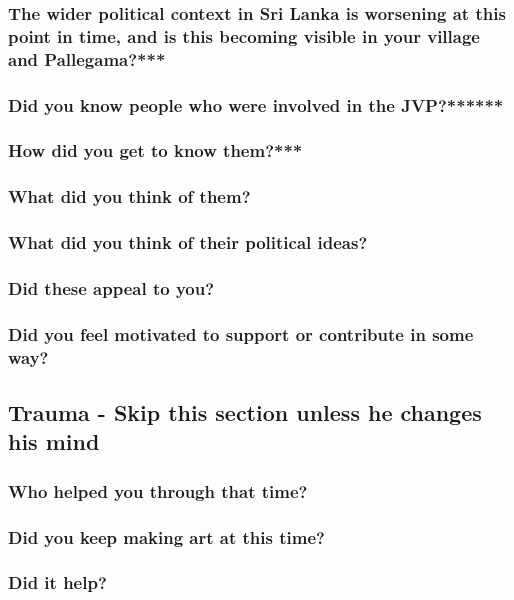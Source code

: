 \documentclass[11pt]{article}
\begin{document}
\subsubsection{The wider political context in Sri Lanka is worsening at this point in time, and is this becoming visible in your village and Pallegama?***}
\label{sec:org6ca7e3e}
\subsubsection{Did you know people who were involved in the JVP?******}
\label{sec:org410fded}
\subsubsection{How did you get to know them?***}
\label{sec:org663a0cc}
\subsubsection{What did you think of them?}
\label{sec:orga955866}
\subsubsection{What did you think of their political ideas?}
\label{sec:orgf10b172}
\subsubsection{Did these appeal to you?}
\label{sec:org27f5914}
\subsubsection{Did you feel motivated to support or contribute in some way?}
\label{sec:org9c80604}


\subsection{Trauma - Skip this section unless he changes his mind}
\label{sec:org9a0bbe2}

\subsubsection{Who helped you through that time?}
\label{sec:orgdef94c9}
\subsubsection{Did you keep making art at this time?}
\label{sec:org48f9e50}
\subsubsection{Did it help?}
\label{sec:org973a70b}
\end{document}

